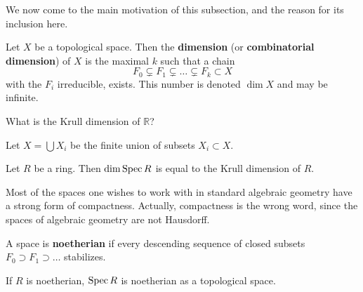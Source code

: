 We now come to the main motivation of this subsection, and the reason for its
inclusion here.

\begin{definition} 
Let $X$ be a topological space. Then the \textbf{dimension} (or
\textbf{combinatorial dimension}) of $X$ is the maximal $k$ such that a chain
\[ F_0 \subsetneq F_1 \subsetneq \dots \subsetneq F_k \subset X  \]
with the $F_i$ irreducible, exists. This number is denoted $\dim X$ and may be
infinite.
\end{definition} 

\begin{exercise} 
What is the Krull dimension of $\mathbb{R}$?
\end{exercise} 

\begin{exercise} 
Let $X = \bigcup X_i$ be the finite union of subsets $X_i \subset X$. 

\end{exercise} 

\begin{exercise} 
Let $R$ be a ring. Then $\dim \operatorname{Spec} R$ is equal to the Krull dimension of $R$. 
\end{exercise} 

Most of the spaces one wishes to work with in standard algebraic geometry have a
strong form of compactness. Actually, compactness is the wrong word, since the
spaces of algebraic geometry are not Hausdorff.

\begin{definition} 
A space is \textbf{noetherian} if every descending sequence of closed subsets
$F_0 \supset F_1 \supset \dots$ stabilizes.
\end{definition} 

\begin{exercise} 
If $R$ is noetherian, $\operatorname{Spec} R$ is noetherian as a topological space.
\end{exercise} 


